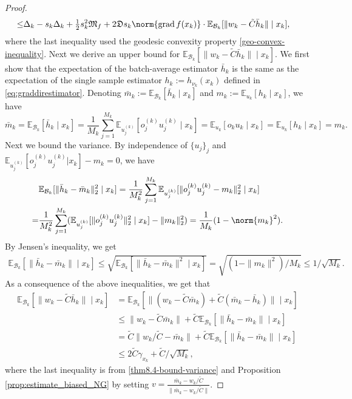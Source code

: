 \documentclass{article}
\newcommand{\pert}{\nu}
\theoremstyle{plain}
\theoremstyle{definition}
\theoremstyle{remark}
\begin{document}
\begin{proof}
\begin{align}
   \leq & \Delta_{k}
   - s_k\Delta_k + \tfrac{1}{2}s_k^2 \mathfrak{M}_f +2\mathfrak{D}s_k \norm{\operatorname{grad}f(x_k)} \cdot\mathbb{E}_{\mathcal{B}_k}[\|w_k-\tilde{C}\bar h_k\|\mid x_k],\label{eq:batch_FW_eq}
\end{align}
where the last inequality used the geodesic convexity property \eqref{geo-convex-inequality}. 
Next we derive an upper bound for $\mathbb{E}_{\mathcal{B}_k}[\|{w_k-\tilde{C}\bar h_k}\|\mid x_k]$. We first show that the expectation of the batch-average estimator $\bar h_k$ is the same as the expectation of the single sample estimator $h_k:=h_{\pert_k}(x_k)$ defined in \eqref{eq:graddirestimator}. Denoting $\bar{m}_k:=\mathbb{E}_{\mathcal{B}_k}[\bar{h}_k\mid x_k ]$ and $m_k:=\mathbb{E}_{u_k}[h_k\mid x_k ]$, we have
\begin{equation}\label{eq:same_expectation}
\bar{m}_k=\mathbb{E}_{\mathcal{B}_k}[\bar{h}_k\mid x_k ]= \frac{1}{M_k} \sum_{j=1}^{M_k} \mathbb{E}_{u^{(k)}_j}[o^{(k)}_j u^{(k)}_j \mid x_k]= \mathbb{E}_{u_k}[o_k u_k\mid x_k ]= \mathbb{E}_{u_k}[h_k \mid x_k] = m_k.
\end{equation}
Next we bound the variance. By independence of $\{u_j\}_j$ and $\mathbb{E}_{u^{(k)}_j}[o^{(k)}_ju^{(k)}_j|x_k]-m_k=0$, we have 
\begin{align*}
    &\mathbb{E}_{\mathcal{B}_k}{[\|\bar{h}_k-\bar{m}_k\|_2^2\mid x_k]}=\frac{1}{M_k^2}\sum_{j=1}^{M_k}\mathbb{E}_{u^{(k)}_j}{[\|o^{(k)}_ju^{(k)}_j-m_k\|_2^2\mid x_k]}\\
    =&\frac{1}{M_k^2}\sum_{j=1}^{M_k}(\mathbb{E}_{u^{(k)}_j}{[\|o^{(k)}_ju^{(k)}_j\|_2^2\mid x_k]}-\|m_k\|_2^2)= \frac{1}{M_k}(1-\norm{m_k}^2).
\end{align*}
By Jensen’s inequality, we get
\begin{align}\label{thm8.4-bound-variance}
\mathbb{E}_{\mathcal{B}_k}\left[\|\bar h_k-\bar m_k\|\mid x_k\right]
\le \sqrt{\mathbb{E}_{\mathcal{B}_k}\left[\|\bar h_k-\bar m_k\|^2 \mid x_k\right]}
= \sqrt{{(1-\|m_k\|^2)}/{M_k}}
\le {1}/{\sqrt{M_k}}.
\end{align}
As a consequence of the above inequalities, we get that
\begin{equation}
\label{eq:batch_mean_plus_var}
\begin{aligned}
\mathbb{E}_{\mathcal{B}_k}[\| w_k-\tilde{C}\bar h_k \|\mid x_k]
&=\mathbb{E}_{\mathcal{B}_k}[\|(w_k-\tilde{C}\bar m_k)
     +\tilde{C}(\bar m_k-\bar h_k)\|\mid x_k]\\
&\le \| w_k-\tilde{C}\bar m_k\|
   +\tilde{C}\mathbb{E}_{\mathcal{B}_k}[\|\bar h_k-\bar m_k\|\mid x_k] \\
&= \tilde{C}\|w_k/\tilde{C}-\bar m_k\|
   +\tilde{C}\mathbb{E}_{\mathcal{B}_k}[\|\bar h_k-\bar m_k\|\mid x_k]\\
&\le 2\tilde{C}\gamma_{x_k}+\tilde{C}/\sqrt{M_k},
\end{aligned}
\end{equation}
where the last inequality is from \eqref{thm8.4-bound-variance} and Proposition \ref{prop:estimate_biased_NG} by setting $v = \frac{\bar{m}_k-w_k/\tilde{C}}{\|\bar{m}_k-w_k/\tilde{C}\|}$.


\end{proof}
\end{document}
